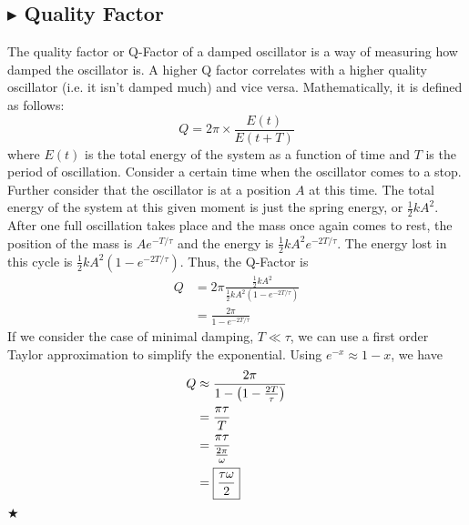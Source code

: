 \subsection{\color{Orchid} $\blacktriangleright$ \color{black} Quality Factor}
The quality factor or Q-Factor of a damped oscillator is a way of measuring how damped the oscillator is. A higher Q factor correlates with a higher quality oscillator (i.e. it isn't damped much) and vice versa. Mathematically, it is defined as follows:
\begin{equation}
    Q = 2\pi \times \frac{E(t)}{E(t+T)}
\end{equation}
\noindent where $E(t)$ is the total energy of the system as a function of time and $T$ is the period of oscillation. Consider a certain time when the oscillator comes to a stop. Further consider that the oscillator is at a position $A$ at this time. The total energy of the system at this given moment is just the spring energy, or $\frac12 k A^2$. After one full oscillation takes place and the mass once again comes to rest, the position of the mass is $Ae^{-T/\tau}$ and the energy is $\frac12 k A^2 e^{-2T/\tau}$. The energy lost in this cycle is $\frac12 k A^2\left(1-e^{-2T/\tau}\right)$. Thus, the Q-Factor is 
\begin{align*}
    Q &= 2\pi\frac{\frac12 kA^2}{\frac12 k A^2\left(1-e^{-2T/\tau}\right)} \\
    &= \frac{2\pi}{1-e^{-2T/\tau}}
\end{align*}
\noindent If we consider the case of minimal damping, $T \ll \tau$, we can use a first order Taylor approximation to simplify the exponential. Using $e^{-x} \approx 1-x$, we have
\begin{align}
    Q &\approx \frac{2\pi}{1-\left(1-\frac{2T}{\tau}\right)} \nonumber \\
    &= \frac{\pi\tau}{T} \nonumber \\
    &= \frac{\pi\tau}{\frac{2\pi}{\omega}} \nonumber \\
    &= \boxed{\frac{\tau\omega}{2}}
\end{align}
$\bigstar$

